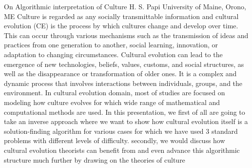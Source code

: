 
    \begin{abstract_online}{On Algorithmic interpretation of Culture}{%
        H. S. Papi}{%
        }{%
        University of Maine, Orono, ME}
    Culture is regarded as any socially transmittable information and cultural evolution (CE) is the process by which cultures change and develop over time. This can occur through various mechanisms such as the transmission of ideas and practices from one generation to another, social learning, innovation, or adaptation to changing circumstances. Cultural evolution can lead to the emergence of new technologies, beliefs, values, customs, and social structures, as well as the disappearance or transformation of older ones. It is a complex and dynamic process that involves interactions between individuals, groups, and the environment. In cultural evolution domain, most of studies are focused on modeling how culture evolves for which wide range of mathematical and computational methods are used. In this presentation, we first of all are going to take an inverse approach where we want to show how cultural evolution itself is a solution-finding algorithm for various cases for which we have used 3 standard problems with different levels of difficulty. secondly, we would discuss how cultural evolution theorists can benefit from and even advance this algorithmic structure much further by drawing on the theories of culture 
    
    \end{abstract_online}
    